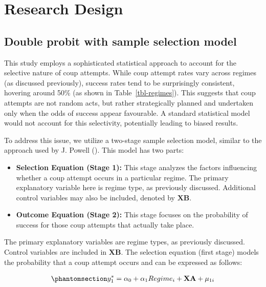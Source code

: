 \documentclass[
  12pt,
]{report}
\begin{document}
\section{Research Design}\label{research-design}

\subsection{Double probit with sample selection
model}\label{double-probit-with-sample-selection-model}

This study employs a sophisticated statistical approach to account for
the selective nature of coup attempts. While coup attempt rates vary
across regimes (as discussed previously), success rates tend to be
surprisingly consistent, hovering around 50\% (as shown in
Table~\ref{tbl-regimes}). This suggests that coup attempts are not
random acts, but rather strategically planned and undertaken only when
the odds of success appear favourable. A standard statistical model
would not account for this selectivity, potentially leading to biased
results.

To address this issue, we utilize a two-stage sample selection model,
similar to the approach used by J. Powell
(). This model has two parts:

\begin{itemize}
\item
  \textbf{Selection Equation (Stage 1):} This stage analyzes the factors
  influencing whether a coup attempt occurs in a particular regime. The
  primary explanatory variable here is regime type, as previously
  discussed. Additional control variables may also be included, denoted
  by \(\mathbf{XB}\).
\item
  \textbf{Outcome Equation (Stage 2):} This stage focuses on the
  probability of success for those coup attempts that actually take
  place.
\end{itemize}

The primary explanatory variables are regime types, as previously
discussed. Control variables are included in \(\mathbf{XB}\). The
selection equation (first stage) models the probability that a coup
attempt occurs and can be expressed as follows:

\begin{equation}\phantomsection\label{eq-eq4}{
\begin{aligned}
y_1^*=\alpha_0 + \alpha_1 Regime_i + \mathbf {XA} + \mu_{1i}
\end{aligned}
}\end{equation}
\end{document}
